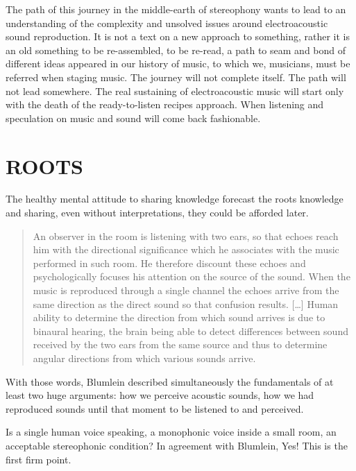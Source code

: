 \documentclass{article}
\begin{document}
The path of this journey in the middle-earth of stereophony wants to lead to an understanding of the complexity and unsolved issues around electroacoustic sound reproduction. It is not a text on a new approach to something, rather it is an old something to be re-assembled, to be re-read, a path to seam and bond of different ideas appeared in our history of music, to which we, musicians, must be referred when staging music. The journey will not complete itself. The path will not lead somewhere. The real sustaining of electroacoustic music will start only with the death of the ready-to-listen recipes approach. When listening and speculation on music and sound will come back fashionable. 

\vfill\null

\newpage

\section{ROOTS}
\label{sec:roots}

The healthy mental attitude to sharing knowledge forecast the roots knowledge and sharing, even without interpretations, they could be afforded later.

\begin{quotation}
An observer in the room is listening with two ears, so that echoes reach him
with the directional significance which he associates with the music performed
in such room. He therefore discount these echoes and psychologically focuses
his attention on the source of the sound. When the music is reproduced through
a single channel the echoes arrive from the same direction as the direct sound
so that confusion results. [\ldots] Human ability to determine the direction from which sound arrives is due to binaural hearing, the brain being able to detect differences between sound received by the two ears from the same source and thus to determine angular directions from which various sounds arrive. \cite{ab58}
\end{quotation}

With those words, Blumlein \cite{ab58} described simultaneously the fundamentals of at least two huge arguments: how we perceive acoustic sounds, how we had reproduced sounds until that moment to be listened to and perceived.

Is a single human voice speaking, a monophonic voice inside a small room, an acceptable stereophonic condition? In agreement with Blumlein, Yes! This is the first firm point.
\end{document}
